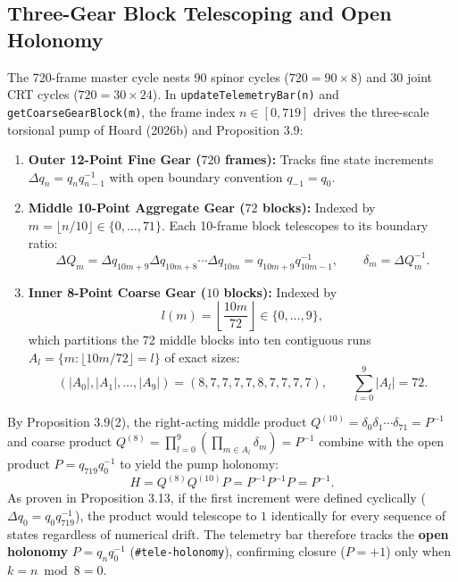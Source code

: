 \documentclass[11pt, a4paper]{article}
\begin{document}
\subsection{Three-Gear Block Telescoping and Open Holonomy}
The 720-frame master cycle nests 90 spinor cycles ($720 = 90 \times 8$) and 30 joint CRT cycles ($720 = 30 \times 24$). In \texttt{updateTelemetryBar(n)} and \texttt{getCoarseGearBlock(m)}, the frame index $n \in [0, 719]$ drives the three-scale torsional pump of Hoard (2026b) and Proposition 3.9:
\begin{enumerate}
    \item \textbf{Outer 12-Point Fine Gear ($720$ frames):} Tracks fine state increments $\Delta q_n = q_n q_{n-1}^{-1}$ with open boundary convention $q_{-1} = q_0$.
    \item \textbf{Middle 10-Point Aggregate Gear ($72$ blocks):} Indexed by $m = \lfloor n / 10 \rfloor \in \{0, \dots, 71\}$. Each 10-frame block telescopes to its boundary ratio:
    \begin{equation}
    \Delta Q_m = \Delta q_{10m+9}\Delta q_{10m+8}\cdots \Delta q_{10m} = q_{10m+9}q_{10m-1}^{-1}, \qquad \delta_m = \Delta Q_m^{-1}.
    \end{equation}
    \item \textbf{Inner 8-Point Coarse Gear ($10$ blocks):} Indexed by
    \begin{equation}
    l(m) = \left\lfloor \frac{10m}{72} \right\rfloor \in \{0, \dots, 9\},
    \end{equation}
    which partitions the 72 middle blocks into ten contiguous runs $A_l = \{m : \lfloor 10m/72\rfloor = l\}$ of exact sizes:
    \begin{equation}
    (|A_0|, |A_1|, \dots, |A_9|) = (8, 7, 7, 7, 7, 8, 7, 7, 7, 7), \qquad \sum_{l=0}^9 |A_l| = 72.
    \end{equation}
\end{enumerate}
By Proposition 3.9(2), the right-acting middle product $Q^{(10)} = \delta_0 \delta_1 \cdots \delta_{71} = P^{-1}$ and coarse product $Q^{(8)} = \prod_{l=0}^9 \left(\prod_{m \in A_l} \delta_m\right) = P^{-1}$ combine with the open product $P = q_{719}q_0^{-1}$ to yield the pump holonomy:
\begin{equation}
H = Q^{(8)} Q^{(10)} P = P^{-1} P^{-1} P = P^{-1}.
\end{equation}
As proven in Proposition 3.13, if the first increment were defined cyclically ($\Delta q_0 = q_0 q_{719}^{-1}$), the product would telescope to $1$ identically for every sequence of states regardless of numerical drift. The telemetry bar therefore tracks the \textbf{open holonomy} $P = q_n q_0^{-1}$ (\texttt{\#tele-holonomy}), confirming closure ($P = +1$) only when $k = n \bmod 8 = 0$.
\end{document}
